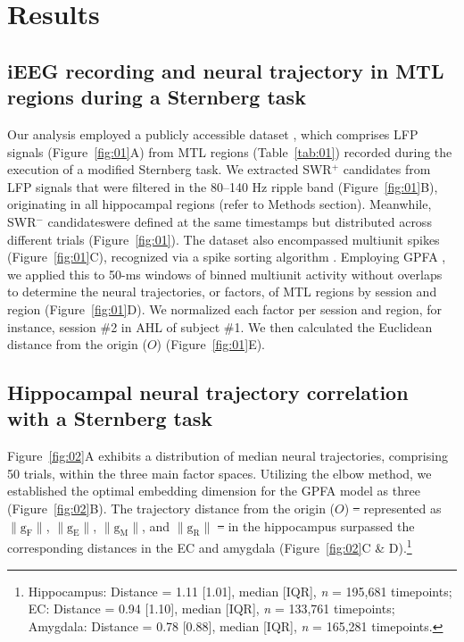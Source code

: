 \documentclass[final,3p,times,twocolumn]{elsarticle}
\providecommand{\DIFaddtex}[1]{{\protect\color{blue}\uwave{#1}}} %
\providecommand{\DIFdeltex}[1]{{\protect\color{red}\sout{#1}}}                      %
\providecommand{\DIFaddbegin}{} %
\providecommand{\DIFaddend}{} %
\providecommand{\DIFdelbegin}{} %
\providecommand{\DIFdelend}{} %
\providecommand{\DIFadd}[1]{\texorpdfstring{\DIFaddtex{#1}}{#1}} %
\providecommand{\DIFdel}[1]{\texorpdfstring{\DIFdeltex{#1}}{}} %
\newcommand{\DIFscaledelfig}{0.5}
\newlength{\DIFdelgraphicswidth} %
\newlength{\DIFdelgraphicsheight} %
\newcommand{\DIFaddincludegraphics}[2][]{{\color{blue}\fbox{\DIFOincludegraphics[#1]{#2}}}} %
\newcommand{\DIFdelincludegraphics}[2][]{%
\sbox{\DIFdelgraphicsbox}{\DIFOincludegraphics[#1]{#2}}%
\settoboxwidth{\DIFdelgraphicswidth}{\DIFdelgraphicsbox} %
\settoboxtotalheight{\DIFdelgraphicsheight}{\DIFdelgraphicsbox} %
\scalebox{\DIFscaledelfig}{%
\parbox[b]{\DIFdelgraphicswidth}{\usebox{\DIFdelgraphicsbox}\\[-\baselineskip] \rule{\DIFdelgraphicswidth}{0em}}\llap{\resizebox{\DIFdelgraphicswidth}{\DIFdelgraphicsheight}{%
\setlength{\unitlength}{\DIFdelgraphicswidth}%
\begin{picture}(1,1)%
\thicklines\linethickness{2pt} %
{\color[rgb]{1,0,0}\put(0,0){\framebox(1,1){}}}%
{\color[rgb]{1,0,0}\put(0,0){\line( 1,1){1}}}%
{\color[rgb]{1,0,0}\put(0,1){\line(1,-1){1}}}%
\end{picture}%
}\hspace*{3pt}}} %
} %
\DeclareRobustCommand{\DIFaddbegin}{\DIFOaddbegin \let\includegraphics\DIFaddincludegraphics} %
\DeclareRobustCommand{\DIFaddend}{\DIFOaddend \let\includegraphics\DIFOincludegraphics} %
\DeclareRobustCommand{\DIFdelbegin}{\DIFOdelbegin \let\includegraphics\DIFdelincludegraphics} %
\DeclareRobustCommand{\DIFdelend}{\DIFOaddend \let\includegraphics\DIFOincludegraphics} %
\begin{document}
\DIFdelend \label{sec:methods}
\section{Results}
\subsection{iEEG recording and neural trajectory in MTL regions during a Sternberg task}
Our analysis employed a publicly accessible dataset \cite{boran_dataset_2020}, which comprises LFP signals (Figure~\ref{fig:01}A) from MTL regions (Table~\ref{tab:01}) recorded during the execution of a modified Sternberg task. We extracted SWR$^+$ candidates from LFP signals that were filtered in the 80--140 Hz ripple band (Figure~\ref{fig:01}B), originating in all hippocampal regions (refer to Methods section). Meanwhile, SWR$^-$ candidates\DIFaddbegin \DIFadd{, control events for SWR$^+$ candidates, }\DIFaddend were defined at the same timestamps but distributed across different trials (Figure~\ref{fig:01}). The dataset also encompassed multiunit spikes (Figure~\ref{fig:01}C), recognized via a spike sorting algorithm \cite{niediek_reliable_2016}. Employing GPFA \cite{yu_gaussian-process_2009}, we applied this to 50-ms windows of binned multiunit activity without overlaps to determine the neural trajectories, or factors, of MTL regions by session and region (Figure~\ref{fig:01}D). We normalized each factor per session and region, for instance, session \#2 in AHL of subject \#1. We then calculated the Euclidean distance from the origin ($O$) (Figure~\ref{fig:01}E).

\subsection{Hippocampal neural trajectory correlation with a Sternberg task}
Figure~\ref{fig:02}A exhibits a distribution of median neural trajectories, comprising 50 trials, within the three main factor spaces. Utilizing the elbow method, we established the optimal embedding dimension for the GPFA model as three (Figure~\ref{fig:02}B). The trajectory distance from the origin ($O$) \DIFdelbegin \DIFdel{-- }\DIFdelend \DIFaddbegin \DIFadd{--- }\DIFaddend represented as $\mathrm{\lVert g_{F} \rVert}$, $\mathrm{\lVert g_{E} \rVert}$, $\mathrm{\lVert g_{M} \rVert}$, and $\mathrm{\lVert g_{R} \rVert}$ \DIFdelbegin \DIFdel{–  }\DIFdelend \DIFaddbegin \DIFadd{--- }\DIFaddend in the hippocampus surpassed the corresponding distances in the EC and amygdala (Figure~\ref{fig:02}C \& D).\footnote{Hippocampus: Distance = 1.11 [1.01], median [IQR], \textit{n} = 195,681 timepoints; EC: Distance = 0.94 [1.10], median [IQR], \textit{n} = 133,761 timepoints; Amygdala: Distance = 0.78 [0.88], median [IQR], \textit{n} = 165,281 timepoints.}
\DIFdelbegin %
\end{document}
